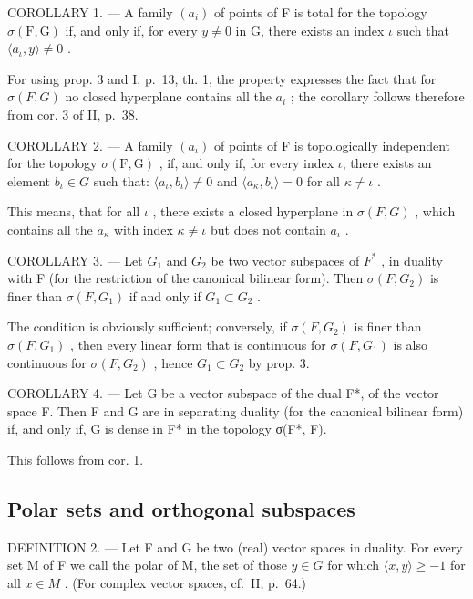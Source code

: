 COROLLARY 1. --- A family \((a_i)\) of points of F is total for the topology \(\sigma(\mathrm{F},\mathrm{G})\) if, and only if, for every \(y \neq 0\) in G, there exists an index \(\iota\) such that \(\langle a_{\iota}, y \rangle \neq 0\) .

For using prop. 3 and I, p.~13, th. 1, the property expresses the fact that for \(\sigma(F, G)\) no closed hyperplane contains all the \(a_{i}\) ; the corollary follows therefore from cor. 3 of II, p.~38.

COROLLARY 2. --- A family \((a_{\iota})\) of points of F is topologically independent for the topology \(\sigma(\mathrm{F}, \mathrm{G})\) , if, and only if, for every index \(\iota\), there exists an element \(b_{\iota} \in G\) such that: \(\langle a_{\iota}, b_{\iota} \rangle \neq 0\) and \(\langle a_{\kappa}, b_{\iota} \rangle = 0\) for all \(\kappa \neq \iota\) .

This means, that for all \(\iota\) , there exists a closed hyperplane in \(\sigma(F, G)\) , which contains all the \(a_{\kappa}\) with index \(\kappa \neq \iota\) but does not contain \(a_{\iota}\) .

COROLLARY 3. --- Let \(G_{1}\) and \(G_{2}\) be two vector subspaces of \(F^{*}\) , in duality with F (for the restriction of the canonical bilinear form). Then \(\sigma(F, G_{2})\) is finer than \(\sigma(F, G_{1})\) if and only if \(G_{1} \subset G_{2}\) .

The condition is obviously sufficient; conversely, if \(\sigma(F, G_2)\) is finer than \(\sigma(F, G_1)\) , then every linear form that is continuous for \(\sigma(F, G_1)\) is also continuous for \(\sigma(F, G_2)\) , hence \(G_1 \subset G_2\) by prop. 3.

COROLLARY 4. --- Let G be a vector subspace of the dual F*, of the vector space F. Then F and G are in separating duality (for the canonical bilinear form) if, and only if, G is dense in F* in the topology σ(F*, F).

This follows from cor. 1.

\subsection{Polar sets and orthogonal subspaces}

DEFINITION 2. --- Let F and G be two (real) vector spaces in duality. For every set M of F we call the polar of M, the set of those \(y \in G\) for which \(\langle x, y \rangle \geqslant -1\) for all \(x \in M\) . (For complex vector spaces, cf.~II, p.~64.)

